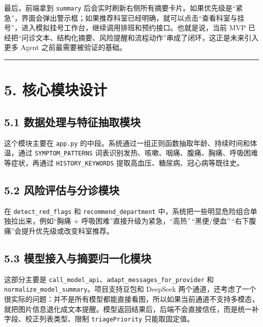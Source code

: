 \documentclass[
  chinese,
  12pt,
  UTF8,
  a4paper]{ctexart}
\begin{document}
最后，前端拿到 \texttt{summary} 后会实时刷新右侧所有摘要卡片。如果优先级是``紧急''，界面会弹出警示框；如果推荐科室已经明确，就可以点击``查看科室与挂号''，进入模拟挂号工作台，继续调用排班和预约接口。也就是说，当前 MVP 已经把``问诊文本、结构化摘要、风险提醒和流程动作''串成了闭环，这正是未来引入更多 Agent 之前最需要被验证的基础。

\begin{center}\rule{0.5\linewidth}{0.5pt}\end{center}

\section{5. 核心模块设计}\label{5-ux6838ux5fc3ux6a21ux5757ux8bbeux8ba1}

\subsection{5.1 数据处理与特征抽取模块}\label{51-ux6570ux636eux5904ux7406ux4e0eux7279ux5f81ux62bdux53d6ux6a21ux5757}

这个模块主要在 \texttt{app.py} 的中段。系统通过一组正则函数抽取年龄、持续时间和体温，通过 \texttt{SYMPTOM\_PATTERNS} 词表识别发热、咳嗽、咽痛、腹痛、胸痛、呼吸困难等症状，再通过 \texttt{HISTORY\_KEYWORDS} 提取高血压、糖尿病、冠心病等既往史。

\subsection{5.2 风险评估与分诊模块}\label{52-ux98ceux9669ux8bc4ux4f30ux4e0eux5206ux8bcaux6a21ux5757}

在 \texttt{detect\_red\_flags} 和 \texttt{recommend\_department} 中，系统把一些明显危险组合单独拉出来，例如``胸痛 + 呼吸困难''直接升级为紧急，``高热''\,``黑便/便血''\,``右下腹痛''会提升优先级或改变科室推荐。

\subsection{5.3 模型接入与摘要归一化模块}\label{53-ux6a21ux578bux63a5ux5165ux4e0eux6458ux8981ux5f52ux4e00ux5316ux6a21ux5757}

这部分主要是 \texttt{call\_model\_api}、\texttt{adapt\_messages\_for\_provider} 和 \texttt{normalize\_model\_summary}。项目支持豆包和 DeepSeek 两个通道，还考虑了一个很实际的问题：并不是所有模型都能直接看图，所以如果当前通道不支持多模态，就把图片信息退化成文本提醒。模型返回结果后，后端不会直接信任，而是统一补字段、校正列表类型、限制 \texttt{triagePriority} 只能取固定值。
\end{document}
